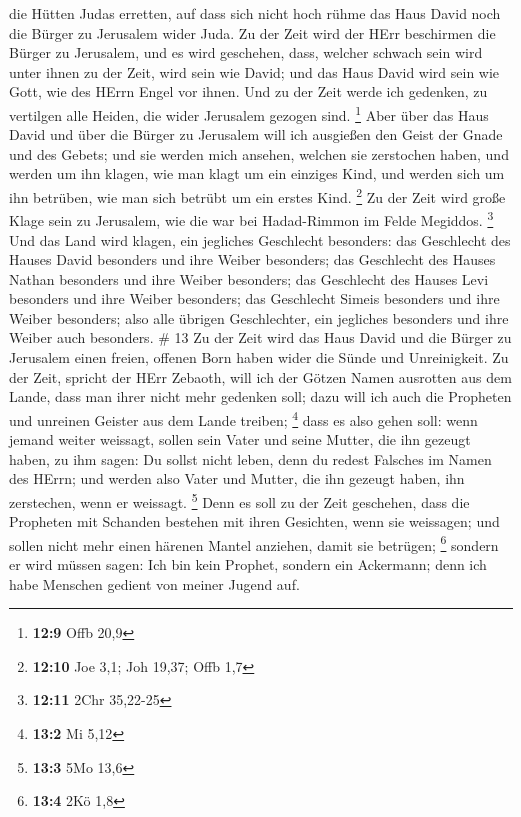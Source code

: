 die Hütten Judas erretten, auf dass sich nicht hoch rühme das Haus David
noch die Bürger zu Jerusalem wider Juda.  Zu der Zeit wird
der HErr beschirmen die Bürger zu Jerusalem, und es wird geschehen,
dass, welcher schwach sein wird unter ihnen zu der Zeit, wird sein wie
David; und das Haus David wird sein wie Gott, wie des HErrn Engel vor
ihnen.  Und zu der Zeit werde ich gedenken, zu vertilgen
alle Heiden, die wider Jerusalem gezogen sind. \footnote{\textbf{12:9}
  Offb 20,9}  Aber über das Haus David und über die Bürger
zu Jerusalem will ich ausgießen den Geist der Gnade und des Gebets; und
sie werden mich ansehen, welchen sie zerstochen haben, und werden um ihn
klagen, wie man klagt um ein einziges Kind, und werden sich um ihn
betrüben, wie man sich betrübt um ein erstes Kind. \footnote{\textbf{12:10}
  Joe 3,1; Joh 19,37; Offb 1,7}  Zu der Zeit wird große
Klage sein zu Jerusalem, wie die war bei Hadad-Rimmon im Felde Megiddos.
\footnote{\textbf{12:11} 2Chr 35,22-25}  Und das Land wird
klagen, ein jegliches Geschlecht besonders: das Geschlecht des Hauses
David besonders und ihre Weiber besonders; das Geschlecht des Hauses
Nathan besonders und ihre Weiber besonders;  das Geschlecht
des Hauses Levi besonders und ihre Weiber besonders; das Geschlecht
Simeis besonders und ihre Weiber besonders;  also alle
übrigen Geschlechter, ein jegliches besonders und ihre Weiber auch
besonders. \# 13  Zu der Zeit wird das Haus David und die
Bürger zu Jerusalem einen freien, offenen Born haben wider die Sünde und
Unreinigkeit.  Zu der Zeit, spricht der HErr Zebaoth, will
ich der Götzen Namen ausrotten aus dem Lande, dass man ihrer nicht mehr
gedenken soll; dazu will ich auch die Propheten und unreinen Geister aus
dem Lande treiben; \footnote{\textbf{13:2} Mi 5,12}  dass es
also gehen soll: wenn jemand weiter weissagt, sollen sein Vater und
seine Mutter, die ihn gezeugt haben, zu ihm sagen: Du sollst nicht
leben, denn du redest Falsches im Namen des HErrn; und werden also Vater
und Mutter, die ihn gezeugt haben, ihn zerstechen, wenn er weissagt.
\footnote{\textbf{13:3} 5Mo 13,6}  Denn es soll zu der Zeit
geschehen, dass die Propheten mit Schanden bestehen mit ihren Gesichten,
wenn sie weissagen; und sollen nicht mehr einen härenen Mantel anziehen,
damit sie betrügen; \footnote{\textbf{13:4} 2Kö 1,8} 
sondern er wird müssen sagen: Ich bin kein Prophet, sondern ein
Ackermann; denn ich habe Menschen gedient von meiner Jugend auf.
